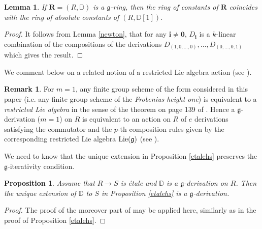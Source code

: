 \documentclass[10pt]{amsart}
\newtheorem{prop}[theorem]{Proposition}
\newtheorem{lemma}[theorem]{Lemma}
\theoremstyle{definition}
\newtheorem{remark}[theorem]{Remark}
\begin{document}
\begin{lemma}\label{absconst}
If $\mathbf{R}=(R,\mathbb{D})$ is a $\mathfrak{g}$-ring, then the ring of constants of $\mathbf{R}$ coincides with the ring of absolute constants of $(R,\mathbb{D}[1])$.
\end{lemma}
\begin{proof}
It follows from Lemma \ref{newton}, that for any $\mathbf{i}\neq \mathbf{0}$, $D_{\mathbf{i}}$ is a $k$-linear combination of the compositions of the derivations $D_{(1,0,\ldots,0)},\ldots,D_{(0,\ldots,0,1)}$ which gives the result.
\end{proof}
\noindent
We comment below on a related notion of a restricted Lie algebra action (see \cite{Tyc}).
\begin{remark}\label{plie}
For $m=1$, any finite group scheme of the form considered in this paper (i.e. any finite group scheme of the \emph{Frobenius height one}) is equivalent to a \emph{restricted Lie algebra} in the sense of the theorem on page 139 of \cite{MuAbel}. Hence a $\mathfrak{g}$-derivation ($m=1$) on $R$ is equivalent to an action on $R$ of $e$ derivations satisfying the commutator and the $p$-th composition rules given by the corresponding restricted Lie algebra $\operatorname{Lie}(\mathfrak{g})$ (see \cite{MuAbel}).
\end{remark}
\noindent
We need to know that the unique extension in Proposition \ref{etalehs} preserves the $\mathfrak{g}$-iterativity condition.
\begin{prop}\label{etalegext}
 Assume that $R\to S$ is  \'{e}tale and $\mathbb{D}$ is a $\mathfrak{g}$-derivation on $R$. Then the unique extension of $\mathbb{D}$ to $S$ in Proposition \ref{etalehs} is a $\mathfrak{g}$-derivation.
\end{prop}
\begin{proof}
The proof of the moreover part of \cite[theorem 27.2]{mat} may be applied here, similarly as in the proof of Proposition \ref{etalehs}.
\end{proof}
\end{document}

